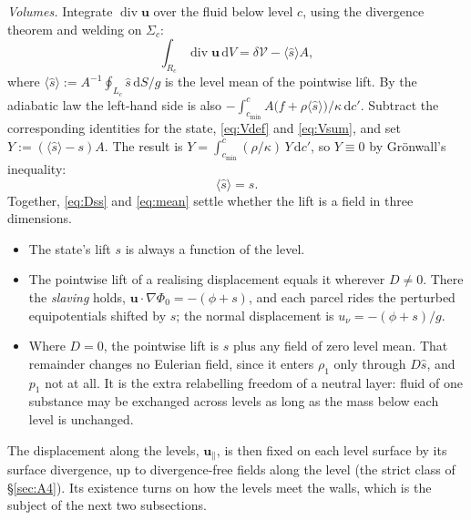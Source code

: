 \documentclass[11pt]{article}
\theoremstyle{definition}
\theoremstyle{remark}
\newcommand{\bu}{\mathbf{u}}
\newcommand{\dS}{\,\mathrm{d}S}
\newcommand{\dV}{\,\mathrm{d}V}
\newcommand{\Div}{\operatorname{div}}
\newcommand{\Vol}{\mathcal V}
\begin{document}
\emph{Volumes.} Integrate $\Div\bu$ over the fluid below level $c$,
using the divergence theorem and welding on $\Sigma_c$:
\begin{equation*}
  \int_{R_c}\Div\bu\dV = \delta\Vol - \langle\hat s\rangle A ,
\end{equation*}
where $\langle\hat s\rangle := A^{-1}\oint_{L_c}\hat s\dS/g$ is the
level mean of the pointwise lift. By the adiabatic law the left-hand
side is also $-\int_{c_{\min}}^cA\bigl(f + \rho\langle\hat
s\rangle\bigr)/\kappa\,\mathrm dc'$. Subtract the corresponding
identities for the state, \eqref{eq:Vdef} and \eqref{eq:Vsum}, and set
$Y := (\langle\hat s\rangle - s)A$. The result is $Y =
\int_{c_{\min}}^c(\rho/\kappa)\,Y\,\mathrm dc'$, so $Y \equiv 0$ by
Gr\"onwall's inequality:
\begin{equation}
  \langle\hat s\rangle = s .
  \label{eq:mean}
\end{equation}
Together, \eqref{eq:Dss} and \eqref{eq:mean} settle whether the lift is
a field in three dimensions.
\begin{itemize}
\item The state's lift $s$ is always a function of the level.
\item The pointwise lift of a realising displacement equals it wherever
  $D \ne 0$. There the \emph{slaving} holds, $\bu\cdot\nabla\Phi_0 =
  -(\phi + s)$, and each parcel rides the perturbed equipotentials
  shifted by $s$; the normal displacement is $u_\nu = -(\phi + s)/g$.
\item Where $D = 0$, the pointwise lift is $s$ plus any field of zero
  level mean. That remainder changes no Eulerian field, since it enters
  $\rho_1$ only through $D\hat s$, and $p_1$ not at all. It is the extra
  relabelling freedom of a neutral layer: fluid of one substance may be
  exchanged across levels as long as the mass below each level is
  unchanged.
\end{itemize}
The displacement along the levels, $\bu_\parallel$, is then fixed on
each level surface by its surface divergence, up to divergence-free
fields along the level (the strict class of \S\ref{sec:A4}). Its
existence turns on how the levels meet the walls, which is the subject
of the next two subsections.
\end{document}
